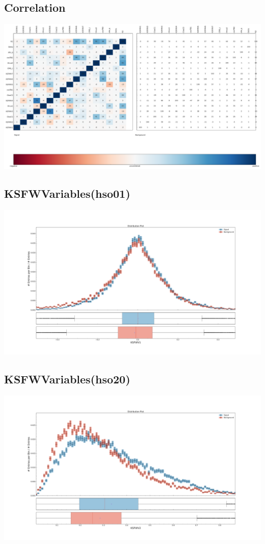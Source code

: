 \documentclass[10pt,a4paper]{article}
\begin{document}
\subsection{Correlation}
\begin{center}
\includegraphics[width=1.0\textwidth]{correlation_plot.pdf}
\end{center}
\subsection{KSFWVariables(hso01)}
\begin{center}
\includegraphics[width=1.0\textwidth]{variable_-6851854384329642222.pdf}
\end{center}
\subsection{KSFWVariables(hso20)}
\begin{center}
\includegraphics[width=1.0\textwidth]{variable_-7999491705771765948.pdf}
\end{center}
\end{document}
